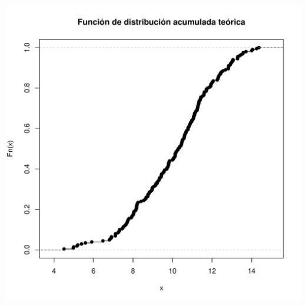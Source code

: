 \documentclass[12pt,letterpaper]{article}\usepackage[]{graphicx}\usepackage[]{color}
\makeatletter
\def\maxwidth{ %
  \ifdim\Gin@nat@width>\linewidth
    \linewidth
  \else
    \Gin@nat@width
  \fi
}
\newenvironment{knitrout}{}{} %
\makeatother
\begin{document}
\begin{knitrout}
\includegraphics[width=\maxwidth]{figure/unnamed-chunk-16-3} 

\end{knitrout}
\end{document}
